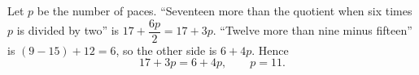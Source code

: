 Let $p$ be the number of paces. ``Seventeen more than the quotient when six times $p$ is divided by two'' is $17+\dfrac{6p}{2}=17+3p$. ``Twelve more than nine minus fifteen'' is $(9-15)+12=6$, so the other side is $6+4p$. Hence
\[17+3p=6+4p,\qquad p=\boxed{11}.\]

